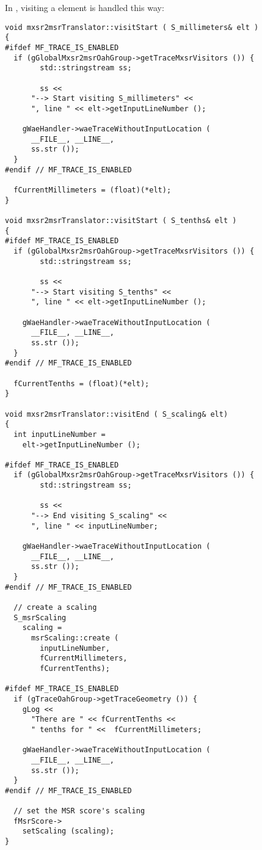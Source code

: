 In , visiting a  element is handled this way:
\begin{lstlisting}[language=CPlusPlus,caption={Visiting {\tt $<$scaling /$>$}}]
void mxsr2msrTranslator::visitStart ( S_millimeters& elt )
{
#ifdef MF_TRACE_IS_ENABLED
  if (gGlobalMxsr2msrOahGroup->getTraceMxsrVisitors ()) {
		std::stringstream ss;

		ss <<
      "--> Start visiting S_millimeters" <<
      ", line " << elt->getInputLineNumber ();

    gWaeHandler->waeTraceWithoutInputLocation (
      __FILE__, __LINE__,
      ss.str ());
  }
#endif // MF_TRACE_IS_ENABLED

  fCurrentMillimeters = (float)(*elt);
}

void mxsr2msrTranslator::visitStart ( S_tenths& elt )
{
#ifdef MF_TRACE_IS_ENABLED
  if (gGlobalMxsr2msrOahGroup->getTraceMxsrVisitors ()) {
		std::stringstream ss;

		ss <<
      "--> Start visiting S_tenths" <<
      ", line " << elt->getInputLineNumber ();

    gWaeHandler->waeTraceWithoutInputLocation (
      __FILE__, __LINE__,
      ss.str ());
  }
#endif // MF_TRACE_IS_ENABLED

  fCurrentTenths = (float)(*elt);
}

void mxsr2msrTranslator::visitEnd ( S_scaling& elt)
{
  int inputLineNumber =
    elt->getInputLineNumber ();

#ifdef MF_TRACE_IS_ENABLED
  if (gGlobalMxsr2msrOahGroup->getTraceMxsrVisitors ()) {
		std::stringstream ss;

		ss <<
      "--> End visiting S_scaling" <<
      ", line " << inputLineNumber;

    gWaeHandler->waeTraceWithoutInputLocation (
      __FILE__, __LINE__,
      ss.str ());
  }
#endif // MF_TRACE_IS_ENABLED

  // create a scaling
  S_msrScaling
    scaling =
      msrScaling::create (
        inputLineNumber,
        fCurrentMillimeters,
        fCurrentTenths);

#ifdef MF_TRACE_IS_ENABLED
  if (gTraceOahGroup->getTraceGeometry ()) {
    gLog <<
      "There are " << fCurrentTenths <<
      " tenths for " <<  fCurrentMillimeters;

    gWaeHandler->waeTraceWithoutInputLocation (
      __FILE__, __LINE__,
      ss.str ());
  }
#endif // MF_TRACE_IS_ENABLED

  // set the MSR score's scaling
  fMsrScore->
    setScaling (scaling);
}
\end{lstlisting}


